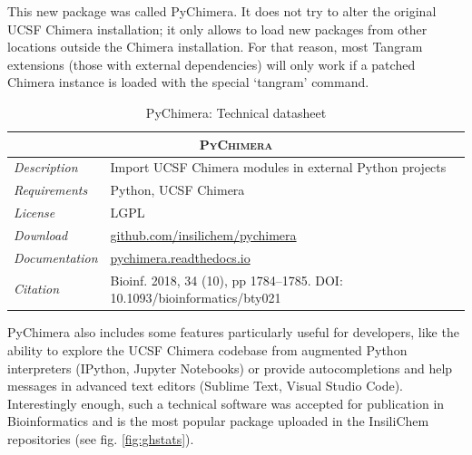 This new package was called PyChimera.\cite{pychimera} It does not try to alter the original UCSF Chimera installation; it only allows to load new packages from other locations outside the Chimera installation. For that reason, most Tangram extensions (those with external dependencies) will only work if a patched Chimera instance is loaded with the special ‘tangram’ command.

\begin{table}[hbtp]
	\caption{PyChimera: Technical datasheet}
	\footnotesize
	\newcommand{\tableheading}[1]{\multicolumn{2}{c}{\textsc{#1}}}
	\begin{tabularx}{\textwidth}{RL}
		\toprule
		\tableheading{PyChimera}\\
		\toprule
		\textit{Description} & Import UCSF Chimera modules in external Python projects \\
		\midrule
		\textit{Requirements} & Python, UCSF Chimera \\
		\midrule
		\textit{License} & LGPL \\
		\midrule
		\textit{Download} & \href{https://github.com/insilichem/pychimera}{github.com/insilichem/pychimera} \\
		\midrule
		\textit{Documentation} & \href{http://pychimera.readthedocs.io}{pychimera.readthedocs.io} \\
		\midrule
		\textit{Citation} & Bioinf. 2018, 34 (10), pp 1784–1785. DOI: 10.1093/bioinformatics/bty021\cite{pychimera} \\
		\bottomrule

	\end{tabularx}
\end{table}

PyChimera also includes some features particularly useful for developers, like the ability to explore the UCSF Chimera codebase from augmented Python interpreters (IPython, Jupyter Notebooks) or provide autocompletions and help messages in advanced text editors (Sublime Text, Visual Studio Code). Interestingly enough, such a technical software was accepted for publication in Bioinformatics and is the most popular package uploaded in the InsiliChem repositories (see fig. \ref{fig:ghstats}).


